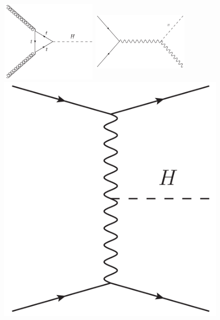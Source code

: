 \begin{figure}[!Hhtbp]
  \begin{center}
    \includegraphics[width=0.42\textwidth, height=4cm]{figs/GluonFusion_H.png}
    \includegraphics[width=0.42\textwidth, height=4cm]{figs/Higgstrahlung.png}
    \includegraphics[scale=0.45]{figs/VBF_H.png}

\end{center}
\end{figure}
